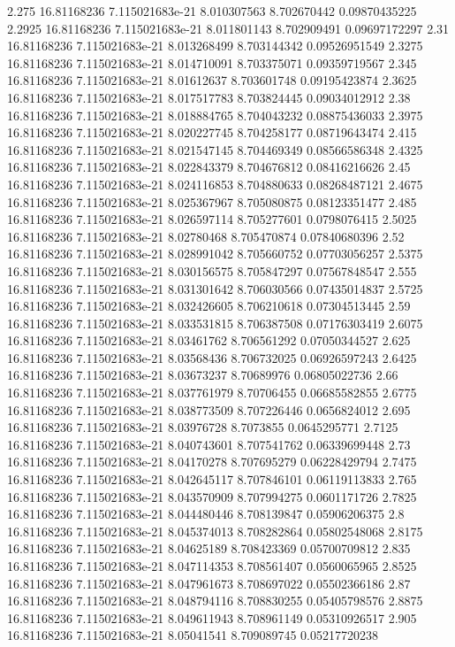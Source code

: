 {2.275 16.81168236 7.115021683e-21 8.010307563 8.702670442 0.09870435225
2.2925 16.81168236 7.115021683e-21 8.011801143 8.702909491 0.09697172297
2.31 16.81168236 7.115021683e-21 8.013268499 8.703144342 0.09526951549
2.3275 16.81168236 7.115021683e-21 8.014710091 8.703375071 0.09359719567
2.345 16.81168236 7.115021683e-21 8.01612637 8.703601748 0.09195423874
2.3625 16.81168236 7.115021683e-21 8.017517783 8.703824445 0.09034012912
2.38 16.81168236 7.115021683e-21 8.018884765 8.704043232 0.08875436033
2.3975 16.81168236 7.115021683e-21 8.020227745 8.704258177 0.08719643474
2.415 16.81168236 7.115021683e-21 8.021547145 8.704469349 0.08566586348
2.4325 16.81168236 7.115021683e-21 8.022843379 8.704676812 0.08416216626
2.45 16.81168236 7.115021683e-21 8.024116853 8.704880633 0.08268487121
2.4675 16.81168236 7.115021683e-21 8.025367967 8.705080875 0.08123351477
2.485 16.81168236 7.115021683e-21 8.026597114 8.705277601 0.0798076415
2.5025 16.81168236 7.115021683e-21 8.02780468 8.705470874 0.07840680396
2.52 16.81168236 7.115021683e-21 8.028991042 8.705660752 0.07703056257
2.5375 16.81168236 7.115021683e-21 8.030156575 8.705847297 0.07567848547
2.555 16.81168236 7.115021683e-21 8.031301642 8.706030566 0.07435014837
2.5725 16.81168236 7.115021683e-21 8.032426605 8.706210618 0.07304513445
2.59 16.81168236 7.115021683e-21 8.033531815 8.706387508 0.07176303419
2.6075 16.81168236 7.115021683e-21 8.03461762 8.706561292 0.07050344527
2.625 16.81168236 7.115021683e-21 8.03568436 8.706732025 0.06926597243
2.6425 16.81168236 7.115021683e-21 8.03673237 8.70689976 0.06805022736
2.66 16.81168236 7.115021683e-21 8.037761979 8.70706455 0.06685582855
2.6775 16.81168236 7.115021683e-21 8.038773509 8.707226446 0.0656824012
2.695 16.81168236 7.115021683e-21 8.03976728 8.7073855 0.0645295771
2.7125 16.81168236 7.115021683e-21 8.040743601 8.707541762 0.06339699448
2.73 16.81168236 7.115021683e-21 8.04170278 8.707695279 0.06228429794
2.7475 16.81168236 7.115021683e-21 8.042645117 8.707846101 0.06119113833
2.765 16.81168236 7.115021683e-21 8.043570909 8.707994275 0.0601171726
2.7825 16.81168236 7.115021683e-21 8.044480446 8.708139847 0.05906206375
2.8 16.81168236 7.115021683e-21 8.045374013 8.708282864 0.05802548068
2.8175 16.81168236 7.115021683e-21 8.04625189 8.708423369 0.05700709812
2.835 16.81168236 7.115021683e-21 8.047114353 8.708561407 0.0560065965
2.8525 16.81168236 7.115021683e-21 8.047961673 8.708697022 0.05502366186
2.87 16.81168236 7.115021683e-21 8.048794116 8.708830255 0.05405798576
2.8875 16.81168236 7.115021683e-21 8.049611943 8.708961149 0.05310926517
2.905 16.81168236 7.115021683e-21 8.05041541 8.709089745 0.05217720238
}
